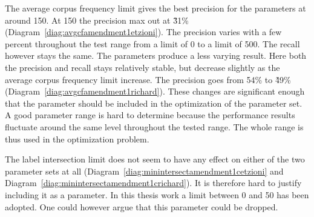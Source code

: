 The average corpus frequency limit gives the best precision for the \citeauthor{Oren1998} parameters at around 150. At 150 the precision max out at \~31\% (Diagram~\ref{diag:avgcfamendment1etzioni}). The precision varies with a few percent throughout the test range from a limit of 0 to a limit of 500. The recall however stays the same. The \cite{Moe2013} parameters produce a less varying result. Here both the precision and recall stays relatively stable, but decrease slightly as the average corpus frequency limit increase. The precision goes from 54\% to \~49\% (Diagram~\ref{diag:avgcfamendment1richard}). These changes are significant enough that the parameter should be included in the optimization of the parameter set. A good parameter range is hard to determine because the performance results fluctuate around the same level throughout the tested range. The whole range is thus used in the optimization problem.

The label intersection limit does not seem to have any effect on either of the two parameter sets at all (Diagram~\ref{diag:minintersectamendment1cetzioni} and Diagram~\ref{diag:minintersectamendment1crichard}). It is therefore hard to justify including it as a parameter. In this thesis work a limit between 0 and 50 has been adopted. One could however argue that this parameter could be dropped.

